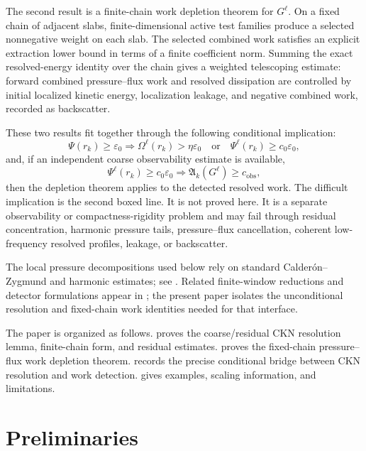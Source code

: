 \documentclass[11pt]{article}
\numberwithin{equation}{section}
\begin{document}
The second result is a finite-chain work depletion theorem for \(G^\ell\).  On a fixed chain of adjacent slabs, finite-dimensional active test families produce a selected nonnegative weight on each slab.  The selected combined work satisfies an explicit extraction lower bound in terms of a finite coefficient norm.  Summing the exact resolved-energy identity over the chain gives a weighted telescoping estimate: forward combined pressure--flux work and resolved dissipation are controlled by initial localized kinetic energy, localization leakage, and negative combined work, recorded as backscatter.

These two results fit together through the following conditional implication:
\[
\boxed{
\Psi(r_k)\ge \varepsilon_0
\Longrightarrow
\Omega^\ell(r_k)>\eta\varepsilon_0
\quad\text{or}\quad
\Psi^\ell(r_k)\ge c_0\varepsilon_0,
}
\]
and, if an independent coarse observability estimate is available,
\[
\boxed{
\Psi^\ell(r_k)\ge c_0\varepsilon_0
\Longrightarrow
\mathfrak A_k(G^\ell)\ge c_{\mathrm{obs}},
}
\]
then the depletion theorem applies to the detected resolved work.  The difficult implication is the second boxed line.  It is not proved here.  It is a separate observability or compactness-rigidity problem and may fail through residual concentration, harmonic pressure tails, pressure--flux cancellation, coherent low-frequency resolved profiles, leakage, or backscatter.

The local pressure decompositions used below rely on standard Calder\'on--Zygmund and harmonic estimates; see \cite{Stein1970}.  Related finite-window reductions and detector formulations appear in \cite{Yu2026InvisibleCascades,Yu2026CriticalLedgers,Yu2026SingularityAudit,Yu2026ComputationalAntiPhantom,Yu2026SharpLocalToClean}; the present paper isolates the unconditional resolution and fixed-chain work identities needed for that interface.

The paper is organized as follows.   proves the coarse/residual CKN resolution lemma, finite-chain form, and residual estimates.   proves the fixed-chain pressure--flux work depletion theorem.   records the precise conditional bridge between CKN resolution and work detection.   gives examples, scaling information, and limitations.

\section{Preliminaries}
\end{document}
